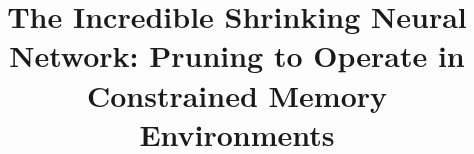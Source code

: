 \documentclass[hidelinks]{article} %
\title{The Incredible Shrinking Neural Network: Pruning to Operate in Constrained Memory Environments}
\begin{document}
\maketitle





%

%


%

%
%
\pagebreak


%
%





\end{document}
